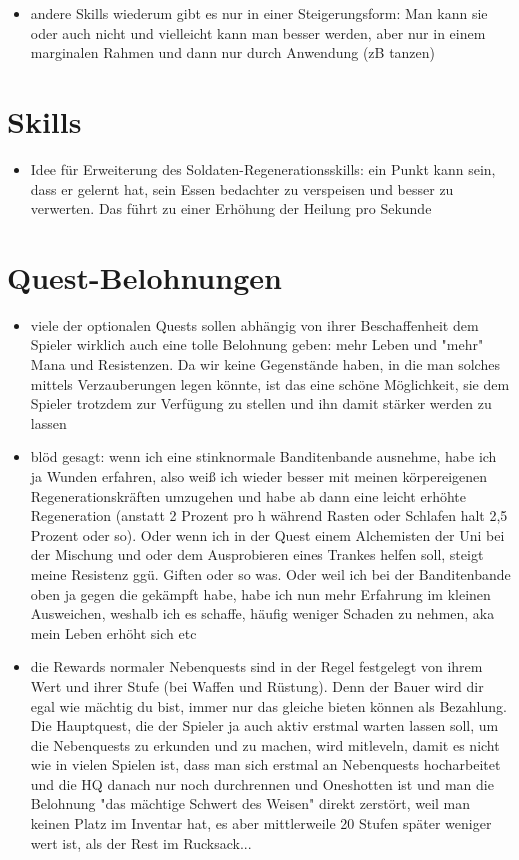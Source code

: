 \begin{itemize}
	\item andere Skills wiederum gibt es nur in einer Steigerungsform: Man kann sie oder auch nicht und vielleicht kann man besser werden, aber nur in einem marginalen Rahmen und dann nur durch Anwendung (zB tanzen)
\end{itemize}

\section{Skills}
\begin{itemize}
	\item Idee für Erweiterung des Soldaten-Regenerationsskills: ein Punkt kann sein, dass er gelernt hat, sein Essen bedachter zu verspeisen und besser zu verwerten. Das führt zu einer Erhöhung der Heilung pro Sekunde
\end{itemize}

\section{Quest-Belohnungen}
\begin{itemize}
	\item viele der optionalen Quests sollen abhängig von ihrer Beschaffenheit dem Spieler wirklich auch eine tolle Belohnung geben: mehr Leben und "mehr" Mana und Resistenzen. Da wir keine Gegenstände haben, in die man solches mittels Verzauberungen legen könnte, ist das eine schöne Möglichkeit, sie dem Spieler trotzdem zur Verfügung zu stellen und ihn damit stärker werden zu lassen
	\item  blöd gesagt: wenn ich eine stinknormale Banditenbande ausnehme, habe ich ja Wunden erfahren, also weiß ich wieder besser mit meinen körpereigenen Regenerationskräften umzugehen und habe ab dann eine leicht erhöhte Regeneration (anstatt 2 Prozent pro h während Rasten oder Schlafen halt 2,5 Prozent oder so). Oder wenn ich in der Quest einem Alchemisten der Uni bei der Mischung und oder dem Ausprobieren eines Trankes helfen soll, steigt meine Resistenz ggü. Giften oder so was. Oder weil ich bei der Banditenbande oben ja gegen die gekämpft habe, habe ich nun mehr Erfahrung im kleinen Ausweichen, weshalb ich es schaffe, häufig weniger Schaden zu nehmen, aka mein Leben erhöht sich etc
	\item  die Rewards normaler Nebenquests sind in der Regel festgelegt von ihrem Wert und ihrer Stufe (bei Waffen und Rüstung). Denn der Bauer wird dir egal wie mächtig du bist, immer nur das gleiche bieten können als Bezahlung. Die Hauptquest, die der Spieler ja auch aktiv erstmal warten lassen soll, um die Nebenquests zu erkunden und zu machen,  wird mitleveln, damit es nicht wie in vielen Spielen ist, dass man sich erstmal an Nebenquests hocharbeitet und die HQ danach nur noch durchrennen und Oneshotten ist und man die Belohnung "das mächtige Schwert des Weisen" direkt zerstört, weil man keinen Platz im Inventar hat, es aber mittlerweile 20 Stufen später weniger wert ist, als der Rest im Rucksack...
\end{itemize}